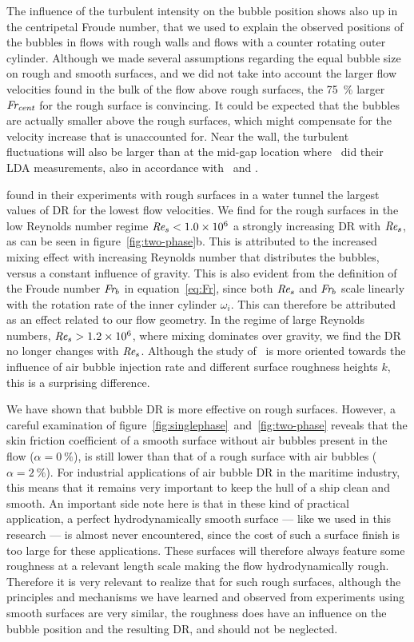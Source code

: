 \documentclass[aps,twocolumn,10pt,floatfix, superscriptaddress,longbibliography,pra]{revtex4-1}
\newcommand\Rey{\mbox{\textit{Re$_s$}}}  %
\newcommand\Fr{\mbox{\textit{Fr$_b$}}}  %
\newcommand\Frcent{\mbox{\textit{Fr$_\text{cent}$}}}  %
\newcommand{\perc}[1]{ \SI{#1}{\percent} }
\newcommand{\e}[1]{\times 10^{#1}}
\begin{document}
The influence of the turbulent intensity on the bubble position shows also up in the centripetal Froude number, that we used to explain the observed positions of the bubbles in flows with rough walls and flows with a counter rotating outer cylinder. Although we made several assumptions regarding the equal bubble size on rough and smooth surfaces, and we did not take into account the larger flow velocities found in the bulk of the flow above rough surfaces, the \SI{75}{\percent} larger $\Frcent$ for the rough surface is convincing. It could be expected that the bubbles are actually smaller above the rough surfaces, which might compensate for the velocity increase that is unaccounted for. Near the wall, the turbulent fluctuations will also be larger than at the mid-gap location where~\cite{Bakhuis2019} did their LDA measurements, also in accordance with~\cite{Huisman2013} and \cite{Berghout2019}.

\cite{Deutsch2004} found in their experiments with rough surfaces in a water tunnel the largest values of DR for the lowest flow velocities. We find for the rough surfaces in the low Reynolds number regime $\Rey < 1.0\e{6}$ a strongly increasing DR with $\Rey$, as can be seen in figure~\ref{fig:two-phase}b. This is attributed to the increased mixing effect with increasing Reynolds number that distributes the bubbles, versus a constant influence of gravity. This is also evident from the definition of the Froude number $\Fr$ in equation~\ref{eq:Fr}, since both $\Rey$ and $\Fr$ scale linearly with the rotation rate of the inner cylinder $\omega_i$. This can therefore be attributed as an effect related to our flow geometry. In the regime of large Reynolds numbers, $\Rey > 1.2\e{6}$, where mixing dominates over gravity, we find the DR no longer changes with $\Rey$. Although the study of~\cite{Deutsch2004} is more oriented towards the influence of air bubble injection rate and different surface roughness heights $k$, this is a surprising difference.

We have shown that bubble DR is more effective on rough surfaces. However, a careful examination of figure~\ref{fig:singlephase}~and~\ref{fig:two-phase} reveals that the skin friction coefficient of a smooth surface without air bubbles present in the flow ($\alpha = \perc{0}$), is still lower than that of a rough surface with air bubbles ($\alpha = \perc{2}$). For industrial applications of air bubble DR in the maritime industry, this means that it remains very important to keep the hull of a ship clean and smooth. An important side note here is that in these kind of practical application, a perfect hydrodynamically smooth surface --- like we used in this research --- is almost never encountered, since the cost of such a surface finish is too large for these applications. These surfaces will therefore always feature some roughness at a relevant length scale making the flow hydrodynamically rough. Therefore it is very relevant to realize that for such rough surfaces, although the principles and mechanisms we have learned and observed from experiments using smooth surfaces are very similar, the roughness does have an influence on the bubble position and the resulting DR, and should not be neglected.
\end{document}
